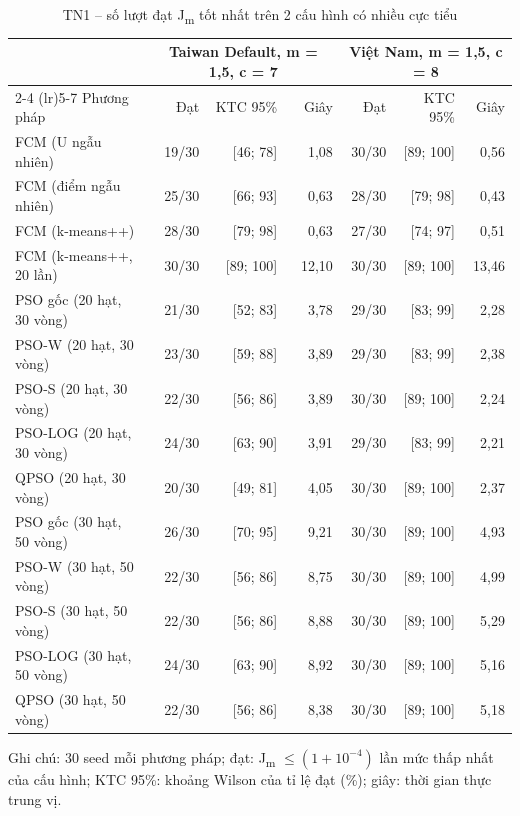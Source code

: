 \begin{table}[htbp]
\centering
\caption{TN1 -- số lượt đạt J\textsubscript{m} tốt nhất trên 2 cấu hình có nhiều cực tiểu}
\label{tab:e7-dat-j}
\footnotesize
\setlength{\tabcolsep}{3pt}
\begin{tabular}{@{}lrrrrrr@{}}
\toprule
& \multicolumn{3}{c}{Taiwan Default, m = 1,5, c = 7} & \multicolumn{3}{c}{Việt Nam, m = 1,5, c = 8} \\
\cmidrule(lr){2-4} \cmidrule(lr){5-7}
Phương pháp & Đạt & KTC 95\% & Giây & Đạt & KTC 95\% & Giây \\
\midrule
FCM (U ngẫu nhiên) & 19/30 & [46; 78] & 1,08 & 30/30 & [89; 100] & 0,56 \\
FCM (điểm ngẫu nhiên) & 25/30 & [66; 93] & 0,63 & 28/30 & [79; 98] & 0,43 \\
FCM (k-means++) & 28/30 & [79; 98] & 0,63 & 27/30 & [74; 97] & 0,51 \\
FCM (k-means++, 20 lần) & 30/30 & [89; 100] & 12,10 & 30/30 & [89; 100] & 13,46 \\
\midrule
PSO gốc (20 hạt, 30 vòng) & 21/30 & [52; 83] & 3,78 & 29/30 & [83; 99] & 2,28 \\
PSO-W (20 hạt, 30 vòng) & 23/30 & [59; 88] & 3,89 & 29/30 & [83; 99] & 2,38 \\
PSO-S (20 hạt, 30 vòng) & 22/30 & [56; 86] & 3,89 & 30/30 & [89; 100] & 2,24 \\
PSO-LOG (20 hạt, 30 vòng) & 24/30 & [63; 90] & 3,91 & 29/30 & [83; 99] & 2,21 \\
QPSO (20 hạt, 30 vòng) & 20/30 & [49; 81] & 4,05 & 30/30 & [89; 100] & 2,37 \\
\midrule
PSO gốc (30 hạt, 50 vòng) & 26/30 & [70; 95] & 9,21 & 30/30 & [89; 100] & 4,93 \\
PSO-W (30 hạt, 50 vòng) & 22/30 & [56; 86] & 8,75 & 30/30 & [89; 100] & 4,99 \\
PSO-S (30 hạt, 50 vòng) & 22/30 & [56; 86] & 8,88 & 30/30 & [89; 100] & 5,29 \\
PSO-LOG (30 hạt, 50 vòng) & 24/30 & [63; 90] & 8,92 & 30/30 & [89; 100] & 5,16 \\
QPSO (30 hạt, 50 vòng) & 22/30 & [56; 86] & 8,38 & 30/30 & [89; 100] & 5,18 \\
\bottomrule
\end{tabular}
\par\smallskip\parbox{\linewidth}{\scriptsize Ghi chú: 30 seed mỗi phương pháp; đạt: J\textsubscript{m} $\le (1 + 10^{-4})$ lần mức thấp nhất của cấu hình; KTC 95\%: khoảng Wilson của tỉ lệ đạt (\%); giây: thời gian thực trung vị.}
\end{table}
